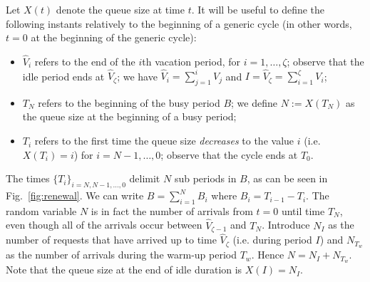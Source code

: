 \documentclass[journal]{IEEEtran}
\begin{document}
Let $X(t)$ denote the queue size at time $t$. It will be useful to define the following instants relatively to the beginning of a generic cycle (in other words, $t=0$ at the beginning of the generic cycle):
\begin{itemize} 
\item $\hat V_i$ refers to the end of the $i$th vacation period, for $i=1,\ldots,\zeta$; observe that the idle period ends at $\hat V_\zeta$; we have $\hat V_i = \sum_{j=1}^i V_j$ and $I =\hat V_\zeta = \sum_{i=1}^{\zeta} V_i$; \item $T_N$ refers to the beginning of the busy period $B$; we define
$N:=X(T_N)$ as the queue size at the beginning of a busy period; 
\item $T_i$ refers to the first time the queue size {\em decreases} to the value $i$ (i.e. $X(T_i)=i$) for $i=N-1,\ldots,0$; observe that the cycle ends at $T_0$.
\end{itemize}
The times $\{T_i\}_{i=N,N-1,\ldots,0}$ delimit $N$ sub periods in $B$, as can be seen in Fig.~\ref{fig:renewal}. We can write $B=\sum_{i=1}^NB_i$ where $B_i=T_{i-1}-T_i$.
The random variable $N$ is in fact the number of arrivals from $t=0$ until time $T_N$, even though all of the arrivals occur between $\hat V_{\zeta -1}$ and $T_N$. Introduce $N_I$ as the number of requests that have arrived up to time $\hat V_\zeta$ (i.e. during period $I$) and $N_{T_w}$ as the number of arrivals during the warm-up period $T_w$. Hence $N=N_I+N_{T_w}$. Note that the queue size at the end of idle duration is $X(I)=N_I$. 
\end{document}
